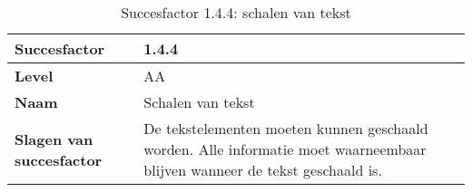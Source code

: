 \begin{table}[H]
    \centering
    \caption{Succesfactor 1.4.4: schalen van tekst }
    \hspace*{-1cm}\begin{tabular}{|l|p{12cm}|} 
        \hline
        \textbf{Succesfactor}                 & 1.4.4                                                                                                                                                                                                                                                                                                                                                                                                                                                                                                             \\ 
        \hline
        \textbf{Level}                        & AA                                                                                                                                                                                                                                                                                                                                                                                                                                                                                                                 \\ 
        \hline
        \textbf{Naam}                         & Schalen van tekst~                                                                                                                                                                                                                                                                                                                                                                                                                                                                                      \\ 
        \hline
        \textbf{Slagen van succesfactor}      & De tekstelementen moeten kunnen geschaald worden. Alle informatie moet waarneembaar blijven wanneer de tekst geschaald is.                                                                                                                                                                                                                                                                                                                                                           \\ 

\end{tabular}
\end{table}
